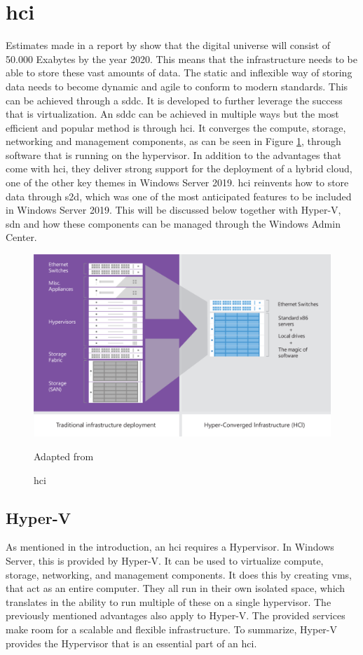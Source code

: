 \section{\acrfull{hci}}
Estimates made in a report by \textcite{Gantz2012} show that the digital universe will consist of 50.000 Exabytes by the year 2020. This means that the infrastructure needs to be able to store these vast amounts of data. The static and inflexible way of storing data needs to become dynamic and agile to conform to modern standards. This can be achieved through a \acrfull{sddc}. It is developed to further leverage the success that is virtualization. An \acrshort{sddc} can be achieved in multiple ways but the most efficient and popular method is through \acrshort{hci}. It converges the compute, storage, networking and management components, as can be seen in Figure \ref{fig:HCI}, through software that is running on the hypervisor. In addition to the advantages that come with \acrshort{hci}, they deliver strong support for the deployment of a hybrid cloud, one of the other key themes in Windows Server 2019. 
\acrshort{hci} reinvents how to store data through \acrshort{s2d}, which was one of the most anticipated features to be included in Windows Server 2019. This will be discussed below together with Hyper-V, \acrshort{sdn} and how these components can be managed through the Windows Admin Center. \autocite{Haag2016}
\begin{figure}[h]
	\includegraphics[width=0.8\linewidth]{img/HCI.png}
	\captionsetup{width=0.6\linewidth}
	\centering		
	\caption{\acrshort{hci}}
	\scriptsize	
	Adapted from \cite{Woolslayer2018}
	\label{fig:HCI}
\end{figure}

\subsection{Hyper-V}
As mentioned in the introduction, an \acrshort{hci} requires a Hypervisor. In Windows Server, this is provided by Hyper-V. It can be used to virtualize compute, storage, networking, and management components.  It does this by creating \acrshort{vm}s, that act as an entire computer. They all run in their own isolated space, which translates in the ability to run multiple of these on a single hypervisor. The previously mentioned advantages also apply to Hyper-V. The provided services make room for a scalable and flexible infrastructure. To summarize, Hyper-V provides the Hypervisor that is an essential part of an \acrshort{hci}. \autocite{Short2016}
